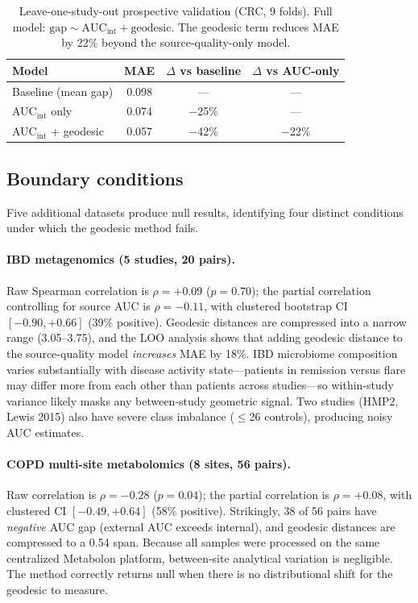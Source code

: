 \documentclass{article}
\begin{document}
\begin{table}[t]
\centering
\caption{Leave-one-study-out prospective validation (CRC, 9 folds). Full model: $\text{gap} \sim \text{AUC}_{\mathrm{int}} + \text{geodesic}$. The geodesic term reduces MAE by 22\% beyond the source-quality-only model.}
\label{tab:loo}
\begin{tabular}{lccc}
\toprule
Model & MAE & $\Delta$ vs baseline & $\Delta$ vs AUC-only \\
\midrule
Baseline (mean gap) & 0.098 & --- & --- \\
AUC$_{\mathrm{int}}$ only & 0.074 & $-$25\% & --- \\
AUC$_{\mathrm{int}}$ + geodesic & 0.057 & $-$42\% & $-$22\% \\
\bottomrule
\end{tabular}
\end{table}


\subsection{Boundary conditions}
\label{sec:boundary}

Five additional datasets produce null results, identifying four distinct conditions under which the geodesic method fails.

\paragraph{IBD metagenomics (5 studies, 20 pairs).} Raw Spearman correlation is $\rho = +0.09$ ($p = 0.70$); the partial correlation controlling for source AUC is $\rho = -0.11$, with clustered bootstrap CI $[-0.90, +0.66]$ (39\% positive). Geodesic distances are compressed into a narrow range (3.05--3.75), and the LOO analysis shows that adding geodesic distance to the source-quality model \emph{increases} MAE by 18\%. IBD microbiome composition varies substantially with disease activity state---patients in remission versus flare may differ more from each other than patients across studies---so within-study variance likely masks any between-study geometric signal. Two studies (HMP2, Lewis 2015) also have severe class imbalance ($\leq$26 controls), producing noisy AUC estimates.

\paragraph{COPD multi-site metabolomics (8 sites, 56 pairs).} Raw correlation is $\rho = -0.28$ ($p = 0.04$); the partial correlation is $\rho = +0.08$, with clustered CI $[-0.49, +0.64]$ (58\% positive). Strikingly, 38 of 56 pairs have \emph{negative} AUC gap (external AUC exceeds internal), and geodesic distances are compressed to a 0.54 span. Because all samples were processed on the same centralized Metabolon platform, between-site analytical variation is negligible. The method correctly returns null when there is no distributional shift for the geodesic to measure.
\end{document}
